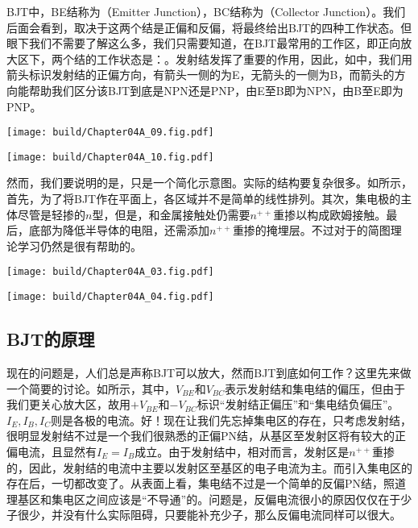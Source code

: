 BJT中，BE结称为（Emitter Junction），BC结称为（Collector Junction）。我们后面会看到，取决于这两个结是正偏和反偏，将最终给出BJT的四种工作状态。但眼下我们不需要了解这么多，我们只需要知道，在BJT最常用的工作区，即正向放大区下，两个结的工作状态是：。发射结发挥了重要的作用，因此，如中，我们用箭头标识发射结的正偏方向，有箭头一侧的为E，无箭头的一侧为B，而箭头的方向能帮助我们区分该BJT到底是NPN还是PNP，由E至B即为NPN，由B至E即为PNP。

\begin{Figure}[BJT的电路符号]
    \begin{FigureSub}[NPN的电路符号]
        \texttt{[image: build/Chapter04A\_09.fig.pdf]}
    \end{FigureSub}
    \hspace{1cm}
    \begin{FigureSub}[PNP的电路符号]
        \texttt{[image: build/Chapter04A\_10.fig.pdf]}
    \end{FigureSub}
\end{Figure}

然而，我们要说明的是，只是一个简化示意图。实际的结构要复杂很多。如所示，首先，为了将BJT作在平面上，各区域并不是简单的线性排列。其次，集电极的主体尽管是轻掺的$n$型，但是，和金属接触处仍需要$n^{++}$重掺以构成欧姆接触。最后，底部为降低半导体的电阻，还需添加$n^{++}$重掺的掩埋层。不过对于的简图理论学习仍然是很有帮助的。

\begin{Figure}[BJT的结构]
    \begin{FigureSub}[NPN的结构]
        \texttt{[image: build/Chapter04A\_03.fig.pdf]}
    \end{FigureSub}
    \hspace{0.2cm}
    \begin{FigureSub}[PNP的结构]
        \texttt{[image: build/Chapter04A\_04.fig.pdf]}
    \end{FigureSub}
\end{Figure}

\subsection{BJT的原理}
现在的问题是，人们总是声称BJT可以放大，然而BJT到底如何工作？这里先来做一个简要的讨论。如所示，其中，$V_{BE}$和$V_{BC}$表示发射结和集电结的偏压，但由于我们更关心放大区，故用$+V_{BE}$和$-V_{BC}$标识“发射结正偏压”和“集电结负偏压”。$I_{E},I_{B},I_C$则是各极的电流。好！现在让我们先忘掉集电区的存在，只考虑发射结，很明显发射结不过是一个我们很熟悉的正偏PN结，从基区至发射区将有较大的正偏电流，且显然有$I_E=I_B$成立。由于发射结中，相对而言，发射区是$n^{++}$重掺的，因此，发射结的电流中主要以发射区至基区的电子电流为主。而引入集电区的存在后，一切都改变了。从表面上看，集电结不过是一个简单的反偏PN结，照道理基区和集电区之间应该是“不导通”的。问题是，反偏电流很小的原因仅仅在于少子很少，并没有什么实际阻碍，只要能补充少子，那么反偏电流同样可以很大。

